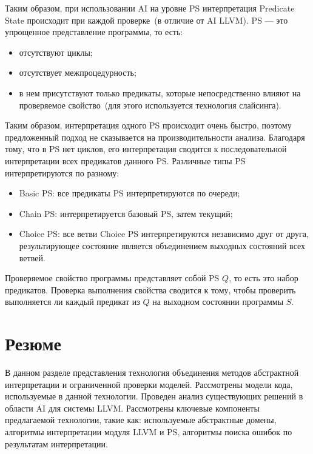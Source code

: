 Таким образом, при использовании AI на уровне PS интерпретация Predicate 
State происходит при каждой проверке~(в отличие от AI LLVM). PS --- это
упрощенное представление программы, то есть:
\begin{itemize}
\item отсутствуют циклы;
\item отсутствует межпроцедурность;
\item в нем присутствуют только предикаты, которые непосредственно влияют на 
проверяемое свойство~(для этого используется технология слайсинга).
\end{itemize}

Таким образом, интерпретация одного PS происходит очень быстро, поэтому 
предложенный подход не сказывается на производительности анализа. Благодаря 
тому, что в PS нет циклов, его интерпретация сводится к последовательной 
интерпретации всех предикатов данного PS. Различные типы PS интерпретируются 
по разному:
\begin{itemize}
\item Basic PS: все предикаты PS интерпретируются по очереди;
\item Chain PS: интерпретируется базовый PS, затем текущий;
\item Choice PS: все ветви Choice PS интерпретируются независимо друг от
друга, результирующее состояние является объединением выходных состояний всех
ветвей.
\end{itemize}

Проверяемое свойство программы представляет собой PS $Q$, то есть это набор 
предикатов. Проверка выполнения свойства сводится к тому, чтобы проверить
выполняется ли каждый предикат из $Q$ на выходном состоянии программы $S$.

\section{Резюме}
В данном разделе представления технология объединения методов абстрактной
интерпретации и ограниченной проверки моделей. Рассмотрены модели кода, 
используемые в данной технологии. Проведен анализ существующих решений в 
области AI для системы LLVM. Рассмотрены ключевые компоненты предлагаемой
технологии, такие как: используемые абстрактные домены, алгоритмы интерпретации
модуля LLVM и PS, алгоритмы поиска ошибок по результатам интерпретации.